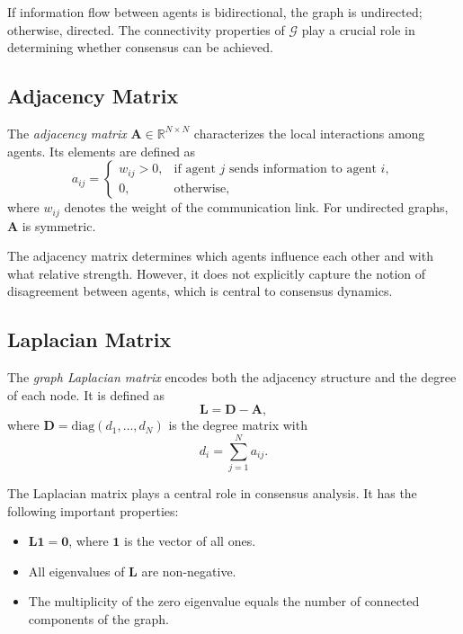 If information flow between agents is bidirectional, the graph is undirected; otherwise, directed.
The connectivity properties of $\mathcal{G}$ play a crucial role in determining whether consensus can be achieved.

\subsection{Adjacency Matrix}

The \textit{adjacency matrix} $\mathbf{A} \in \mathbb{R}^{N \times N}$ characterizes the local interactions among agents.
Its elements are defined as
\begin{equation}
    a_{ij} =
    \begin{cases}
        w_{ij} > 0, & \text{if agent $j$ sends information to agent $i$}, \\
        0, & \text{otherwise},
    \end{cases}
\end{equation}
where $w_{ij}$ denotes the weight of the communication link.
For undirected graphs, $\mathbf{A}$ is symmetric.

The adjacency matrix determines which agents influence each other and with what relative strength.
However, it does not explicitly capture the notion of disagreement between agents, which is central to consensus dynamics.

\subsection{Laplacian Matrix}

The \textit{graph Laplacian matrix} encodes both the adjacency structure and the degree of each node.
It is defined as
\begin{equation}
    \mathbf{L} = \mathbf{D} - \mathbf{A},
\end{equation}
where $\mathbf{D} = \text{diag}(d_1, \dots, d_N)$ is the degree matrix with
\begin{equation}
    d_i = \sum_{j=1}^{N} a_{ij}.
\end{equation}

The Laplacian matrix plays a central role in consensus analysis.
It has the following important properties:
\begin{itemize}
    \item $\mathbf{L}\mathbf{1} = \mathbf{0}$, where $\mathbf{1}$ is the vector of all ones.
    \item All eigenvalues of $\mathbf{L}$ are non-negative.
    \item The multiplicity of the zero eigenvalue equals the number of connected components of the graph.
\end{itemize}

